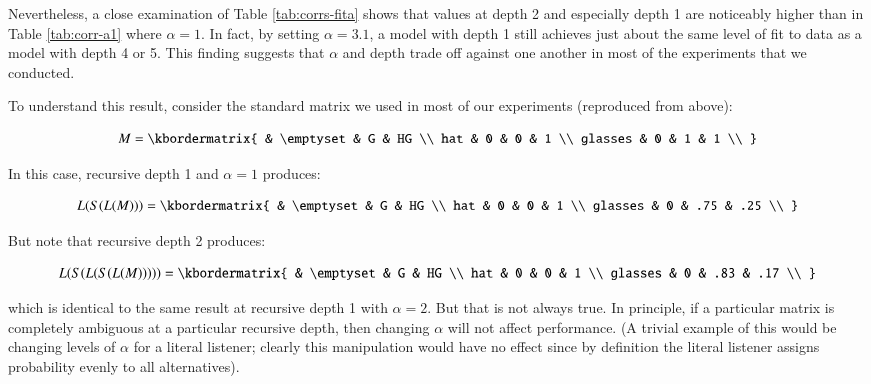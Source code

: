 \documentclass[man,noapacite]{apa2}
\begin{document}
Nevertheless, a close examination of Table \ref{tab:corrs-fita} shows that values at depth 2 and especially depth 1 are noticeably higher than in Table \ref{tab:corr-a1} where $\alpha=1$. In fact, by setting $\alpha=3.1$, a model with depth 1 still achieves just about the same level of fit to data as a model with depth 4 or 5. This finding suggests that $\alpha$ and depth trade off against one another in most of the experiments that we conducted.

To understand this result, consider the standard matrix we used in most of our experiments (reproduced from above):

\begin{equation}
      M = \kbordermatrix{
                 & \emptyset & G & HG \\
        hat      & 0  & 0  & 1  \\
        glasses  & 0  & 1  & 1 \\
      }
\end{equation}

\noindent In this case, recursive depth 1 and $\alpha=1$ produces:

\begin{equation}
      L(S(L(M))) = \kbordermatrix{
                 & \emptyset & G & HG \\
        hat      & 0  & 0  & 1  \\
        glasses  & 0  & .75  & .25 \\
      }
\end{equation}



\noindent But note that recursive depth 2 produces:

\begin{equation}
  L(S(L(S(L(M))))) = \kbordermatrix{
             & \emptyset & G & HG \\
    hat      & 0  & 0  & 1  \\
    glasses  & 0  & .83  & .17 \\
  }
\end{equation}

\noindent which is identical to the same result at recursive depth 1 with $\alpha = 2$. But that is not always true. In principle, if a particular matrix is completely ambiguous at a particular recursive depth, then changing $\alpha$ will not affect performance. (A trivial example of this would be changing levels of $\alpha$ for a literal listener; clearly this manipulation would have no effect since by definition the literal listener assigns probability evenly to all alternatives).
\end{document}
